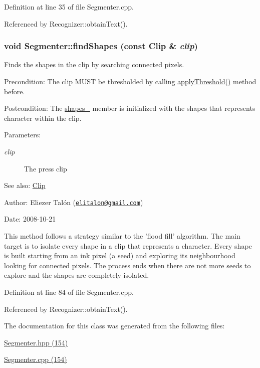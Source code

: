 Definition at line 35 of file Segmenter.cpp.

Referenced by Recognizer::obtainText().\hypertarget{class_segmenter_465c8e755bb56d247add080a04377520}{
\subsubsection[findShapes]{\setlength{\rightskip}{0pt plus 5cm}void Segmenter::findShapes (const {\bf Clip} \& {\em clip})}}
\label{class_segmenter_465c8e755bb56d247add080a04377520}


Finds the shapes in the clip by searching connected pixels. 

\begin{Desc}
\item[Precondition:]The clip MUST be thresholded by calling \hyperlink{class_segmenter_6854315e3320f9d9a8ece14cbb8570ee}{applyThreshold()} method before.\end{Desc}
\begin{Desc}
\item[Postcondition:]The \hyperlink{class_segmenter_3040cc000907ef44e820ddcf70de6f08}{shapes\_\-} member is initialized with the shapes that represents character within the clip.\end{Desc}
\begin{Desc}
\item[Parameters:]
\begin{description}
\item[{\em clip}]The press clip\end{description}
\end{Desc}
\begin{Desc}
\item[See also:]\hyperlink{class_clip}{Clip}\end{Desc}
\begin{Desc}
\item[Author:]Eliezer Talón (\href{mailto:elitalon@gmail.com}{\tt elitalon@gmail.com}) \end{Desc}
\begin{Desc}
\item[Date:]2008-10-21\end{Desc}
This method follows a strategy similar to the 'flood fill' algorithm. The main target is to isolate every shape in a clip that represents a character. Every shape is built starting from an ink pixel (a seed) and exploring its neighbourhood looking for connected pixels. The process ends when there are not more seeds to explore and the shapes are completely isolated. 

Definition at line 84 of file Segmenter.cpp.

Referenced by Recognizer::obtainText().

The documentation for this class was generated from the following files:\begin{CompactItemize}
\item 
\hyperlink{_segmenter_8hpp}{Segmenter.hpp (154)}\item 
\hyperlink{_segmenter_8cpp}{Segmenter.cpp (154)}\end{CompactItemize}
